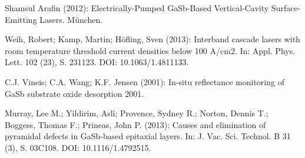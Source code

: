 \documentclass[paper=a4,fontsize=10pt,DIV=18,twocolumn,parskip=half]{scrartcl}
\numberwithin{equation}{section}    %
\begin{document}
\begin{thebibliography}{}   
%

 Shamsul Arafin (2012): Electrically-Pumped GaSb-Based Vertical-Cavity Surface-Emitting Lasers. München.

 Weih, Robert; Kamp, Martin; Höfling, Sven (2013): Interband cascade lasers with room temperature threshold current densities below 100 A/cm2. In: Appl. Phys. Lett. 102 (23), S. 231123. DOI: 10.1063/1.4811133.


 C.J. Vineis; C.A. Wang; K.F. Jensen (2001): In-situ reflectance monitoring of GaSb substrate oxide desorption 2001.

 Murray, Lee M.; Yildirim, Asli; Provence, Sydney R.; Norton, Dennis T.; Boggess, Thomas F.; Prineas, John P. (2013): Causes and elimination of pyramidal defects in GaSb-based epitaxial layers. In: J. Vac. Sci. Technol. B 31 (3), S. 03C108. DOI: 10.1116/1.4792515.
  

\end{thebibliography}
%
%
\onecolumn
\pagestyle{empty}
\end{document}
